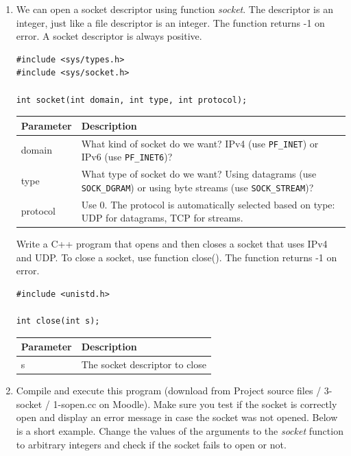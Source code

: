 \documentclass[12pt]{book}
\begin{document}
\begin{enumerate}[resume*]
\item We can open a socket descriptor using function \emph{socket}. The descriptor is an integer, just like a file descriptor is an integer. The function returns -1 on error. A socket descriptor is always positive.

  \begin{lstlisting}
#include <sys/types.h>
#include <sys/socket.h>

int socket(int domain, int type, int protocol);
  \end{lstlisting}

  \begin{tabular}{l p{10cm}}
    \toprule
    Parameter & Description \\
    \midrule
    domain & What kind of socket do we want? IPv4 (use \verb$PF_INET$) or IPv6 (use \verb$PF_INET6$)? \\
    type & What type of socket do we want? Using datagrams (use \verb$SOCK_DGRAM$) or using byte streams (use \verb$SOCK_STREAM$)? \\
    protocol & Use $0$. The protocol is automatically selected based on type: UDP for datagrams, TCP for streams.\\
    \bottomrule
  \end{tabular}

Write a C++ program that opens and then closes a socket that uses IPv4 and UDP. To close a socket, use function close(). The function returns -1 on error.

\begin{lstlisting}
#include <unistd.h>

int close(int s);
\end{lstlisting}

\begin{tabular}{l p{10cm}}
    \toprule
    Parameter & Description \\
    \midrule
    s & The socket descriptor to close\\
    \bottomrule
\end{tabular}


\item Compile and execute this program (download from Project source files / 3-socket / 1-sopen.cc on Moodle). Make sure you test if the socket is correctly open and display an error message in case the socket was not opened. Below is a short example. Change the values of the arguments to the \emph{socket} function to arbitrary integers and check if the socket fails to open or not.


\end{enumerate}
\end{document}
